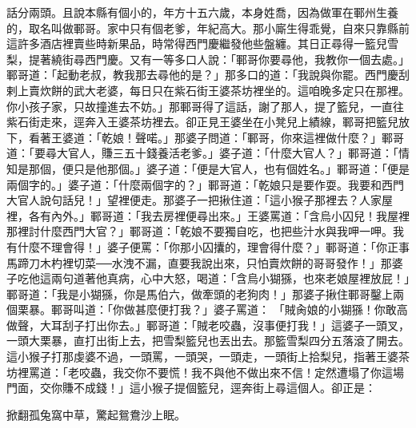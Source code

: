 話分兩頭。且說本縣有個小的，年方十五六歲，本身姓喬，因為做軍在鄆州生養的，取名叫做鄆哥。家中只有個老爹，年紀高大。那小廝生得乖覺，自來只靠縣前這許多酒店裡賣些時新果品，時常得西門慶繼發他些盤纏。其日正尋得一籃兒雪梨，提著繞街尋西門慶。又有一等多口人說：「鄆哥你要尋他，我教你一個去處。」鄆哥道：「起動老叔，教我那去尋他的是？」那多口的道：「我說與你罷。西門慶刮剌上賣炊餅的武大老婆，每日只在紫石街王婆茶坊裡坐的。這咱晚多定只在那裡。你小孩子家，只故撞進去不妨。」那鄆哥得了這話，謝了那人，提了籃兒，一直往紫石街走來，逕奔入王婆茶坊裡去。卻正見王婆坐在小凳兒上績線，鄆哥把籃兒放下，看著王婆道：「乾娘！聲喏。」那婆子問道：「鄆哥，你來這裡做什麼？」鄆哥道：「要尋大官人，賺三五十錢養活老爹。」婆子道：「什麼大官人？」鄆哥道：「情知是那個，便只是他那個。」婆子道：「便是大官人，也有個姓名。」鄆哥道：「便是兩個字的。」婆子道：「什麼兩個字的？」鄆哥道：「乾娘只是要作耍。我要和西門大官人說句話兒！」望裡便走。那婆子一把揪住道：「這小猴子那裡去？人家屋裡，各有內外。」鄆哥道：「我去房裡便尋出來。」王婆罵道：「含烏小囚兒！我屋裡那裡討什麼西門大官？」鄆哥道：「乾娘不要獨自吃，也把些汁水與我呷一呷。我有什麼不理會得！」婆子便罵：「你那小囚攮的，理會得什麼？」鄆哥道：「你正事馬蹄刀木杓裡切菜──水洩不漏，直要我說出來，只怕賣炊餅的哥哥發作！」那婆子吃他這兩句道著他真病，心中大怒，喝道：「含烏小猢猻，也來老娘屋裡放屁！」鄆哥道：「我是小猢猻，你是馬伯六，做牽頭的老狗肉！」那婆子揪住鄆哥鑿上兩個栗暴。鄆哥叫道：「你做甚麼便打我？」婆子罵道： 「賊肏娘的小猢猻！你敢高做聲，大耳刮子打出你去。」鄆哥道：「賊老咬蟲，沒事便打我！」這婆子一頭叉，一頭大栗暴，直打出街上去，把雪梨籃兒也丟出去。那籃雪梨四分五落滾了開去。這小猴子打那虔婆不過，一頭罵，一頭哭，一頭走，一頭街上拾梨兒，指著王婆茶坊裡罵道：「老咬蟲，我交你不要慌！我不與他不做出來不信！定然遭塌了你這場門面，交你賺不成錢！」這小猴子提個籃兒，逕奔街上尋這個人。卻正是：

掀翻孤兔窩中草，驚起鴛鴦沙上眠。
